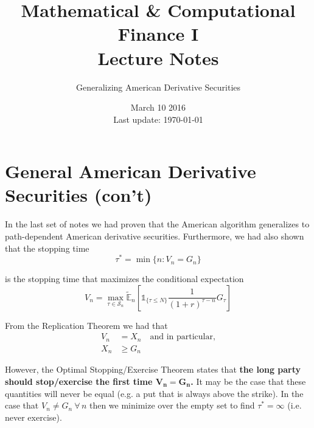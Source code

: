 \documentclass[12pt]{article}
\newlength\tindent
\renewcommand{\indent}{\hspace*{\tindent}}
\newcommand{\E}{\mathbb E}
\begin{document}
 
 
\title{Mathematical \& Computational Finance I\\Lecture Notes}
\author{Generalizing American Derivative Securities}
\date{March 10 2016 \\ Last update: \today{}}
\maketitle

\section{General American Derivative Securities (con't)}

\indent In the last set of notes we had proven that the American algorithm generalizes to path-dependent American derivative securities. Furthermore, we had also shown that the stopping time
\begin{equation*}
	\tau^* = \min\{n:V_n = G_n\}
\end{equation*}

is the stopping time that maximizes the conditional expectation 
\begin{equation*}
	V_n = \max_{\tau \in \mathcal S_n} \tilde{\E}_n \left[ \mathds 1_{\{\tau \leq N\}} \frac{1}{(1 + r)^{\tau - n}} G_\tau \right]
\end{equation*}

From the Replication Theorem we had that
\begin{align*}
	V_n &= X_n \quad \text{and in particular,} \\
	X_n &\geq G_n
\end{align*}

\indent However, the Optimal Stopping/Exercise Theorem states that {\bf the long party should stop/exercise the first time $\bm{V_n = G_n}$.} It may be the case that these quantities will never be equal (e.g. a put that is always above the strike). In the case that $V_n \neq G_n~\forall\, n$ then we minimize over the empty set to find $\tau^* = \infty$ (i.e. never exercise). \\
\end{document}
